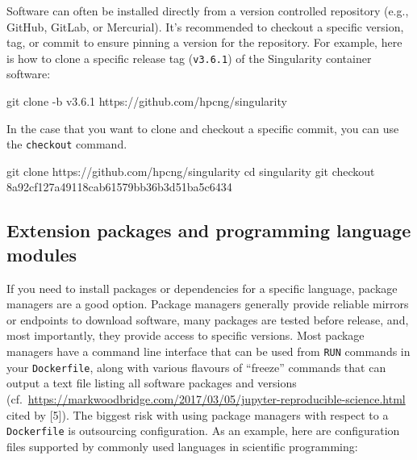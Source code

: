 \documentclass[10pt,letterpaper]{article}
\newenvironment{Shaded}{\begin{snugshade}}{\end{snugshade}}
\newcommand{\BuiltInTok}[1]{#1}
\newcommand{\FunctionTok}[1]{\textcolor[rgb]{0.00,0.00,0.00}{#1}}
\newcommand{\NormalTok}[1]{#1}
\begin{document}
Software can often be installed directly from a version controlled
repository (e.g., GitHub, GitLab, or Mercurial). It's recommended to
checkout a specific version, tag, or commit to ensure pinning a version
for the repository. For example, here is how to clone a specific release
tag (\texttt{v3.6.1}) of the Singularity container software:

\begin{Shaded}
\begin{Highlighting}[]
\FunctionTok{git}\NormalTok{ clone -b v3.6.1 https://github.com/hpcng/singularity}
\end{Highlighting}
\end{Shaded}

In the case that you want to clone and checkout a specific commit, you
can use the \texttt{checkout} command.

\begin{Shaded}
\begin{Highlighting}[]
\FunctionTok{git}\NormalTok{ clone https://github.com/hpcng/singularity}
\BuiltInTok{cd}\NormalTok{ singularity}
\FunctionTok{git}\NormalTok{ checkout 8a92cf127a49118cab61579bb36b3d51ba5c6434}
\end{Highlighting}
\end{Shaded}

\hypertarget{extension-packages-and-programming-language-modules}{%
\subsection{Extension packages and programming language
modules}\label{extension-packages-and-programming-language-modules}}

If you need to install packages or dependencies for a specific language,
package managers are a good option. Package managers generally provide
reliable mirrors or endpoints to download software, many packages are
tested before release, and, most importantly, they provide access to
specific versions. Most package managers have a command line interface
that can be used from \texttt{RUN} commands in your \texttt{Dockerfile},
along with various flavours of ``freeze'' commands that can output a
text file listing all software packages and versions
(cf.~\url{https://markwoodbridge.com/2017/03/05/jupyter-reproducible-science.html}
cited by {[}5{]}). The biggest risk with using package managers with
respect to a \texttt{Dockerfile} is outsourcing configuration. As an
example, here are configuration files supported by commonly used
languages in scientific programming:
\end{document}
